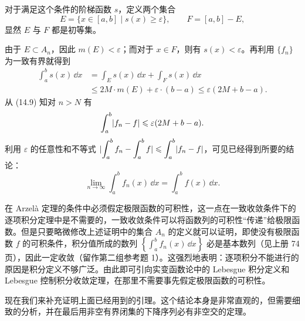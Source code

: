 对于满足这个条件的阶梯函数 $s$，定义两个集合
\[
  E=\{x\in[a,b]\mid s(x)\geqslant\varepsilon\},\qquad F=[a,b]-E,
\]
显然 $E$ 与 $F$ 都是初等集。

由于 $E\subset A_n$，因此 $m(E)<\varepsilon$；而对于 $x\in F$，则有 $s(x)<\varepsilon$。再利用 $\{f_n\}$ 为一致有界就得到
\[
\begin{aligned}
  \int_a^b s(x)\,\dd x
  &=\int_E s(x)\,\dd x+\int_F s(x)\,\dd x\\
  &\leqslant2M\cdot m(E)+\varepsilon\cdot(b-a)\leqslant\varepsilon(2M+b-a).
\end{aligned}
\]
从 (14.9) 知对 $n>N$ 有
\[
  \int_a^b\lvert f_n-f\rvert\leqslant\varepsilon(2M+b-a).
\]
利用 $\varepsilon$ 的任意性和不等式 $\displaystyle\lvert\int_a^b f_n-\int_a^b f\rvert\leqslant\int_a^b\lvert f_n-f\rvert$，可见已经得到所要的结论：
\[
  \lim_{n\to\infty}\int_a^b f_n(x)\,\dd x=\int_a^b f(x)\,\dd x.
\]

\begin{xremark}
在 Arzelà 定理的条件中必须假定极限函数的可积性，这一点在一致收敛条件下的逐项积分定理中是不需要的，一致收敛条件可以将函数列的可积性“传递”给极限函数。但是只要略微修改上述证明中的集合 $A_n$ 的定义就可以证明，即使没有极限函数 $f$ 的可积条件，积分值所成的数列 $\left\{\displaystyle\int_a^b f_n(x)\,\dd x\right\}$ 必是基本数列（见上册 74 页），因此一定收敛（留作第二组参考题 1）。这强烈地表明：逐项积分不能进行的原因是积分定义不够广泛。由此即可引向实变函数论中的 Lebesgue 积分定义和 Lebesgue 控制积分收敛定理，在那里不需要事先假定极限函数的可积性。
\end{xremark}

现在我们来补充证明上面已经用到的引理。这个结论本身是非常直观的，但需要细致的分析，并在最后用非空有界闭集的下降序列必有非空交的定理。

